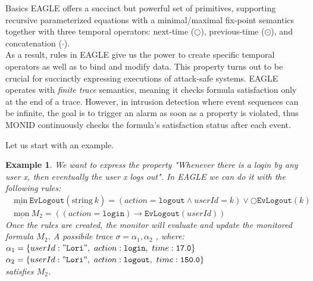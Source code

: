 \documentclass[aspectratio=169,t,xcolor=table]{beamer}
\newtheorem{ex}{Example}
\begin{document}
\begin{frame}[allowframebreaks]{Basics}
    EAGLE offers a succinct but powerful set of primitives, supporting recursive parameterized equations with a minimal/maximal fix-point semantics together with three temporal operators: next-time ($\bigcirc$), previous-time ($\odot$), and concatenation ($\cdot$).\\
    \vspace{2.5mm}
    As a result, rules in EAGLE give us the power to create specific temporal operators as well as to bind and modify data. This property turns out to be crucial for succinctly expressing executions of attack-safe systems.
    \vspace{2.5mm}
    EAGLE operates with \textit{finite trace} semantics, meaning it checks formula satisfaction only at the end of a trace. However, in intrusion detection where event sequences can be infinite, the goal is to trigger an alarm as soon as a property is violated, thus MONID continuously checks the formula's satisfaction status after each event.\\
    \vspace{2.5mm}
    
    Let us start with an example.
    \begin{ex} 
    We want to express the property "\textit{Whenever there is a login by any user x, then eventually the user x logs out}". In EAGLE we can do it with the following rules:\\
    \vspace{2.5mm}
    $\quad \underline{\text{min}}\ \mathtt{EvLogout}(\underline{\text{string}}\ k) = (action = \mathtt{logout}\land userId = k) \lor \bigcirc \mathtt{EvLogout}(k) $\\
    $\quad \underline{\text{mon}}\ M_2 = ((action = \mathtt{login})\rightarrow \mathtt{EvLogout}(userId)) $\\
    \vspace{2.5mm}
    Once the rules are created, the monitor will evaluate and update the monitored formula $M_2$. 
    A possibile trace $\sigma=\alpha_1,\alpha_2 $ , where:\\
    \vspace{2.5mm} 
    $\alpha_1=\{userId:\mathtt{"Lori"},\ action:\mathtt{login},\ time:\mathtt{17.0}\}$ \\$\alpha_2=\{userId:\mathtt{"Lori"},\ action:\mathtt{logout},\ time:\mathtt{150.0}\}$\\ 
    \vspace{2.5mm}
    satisfies $M_2$.
    \end{ex}
\end{frame}
\end{document}
